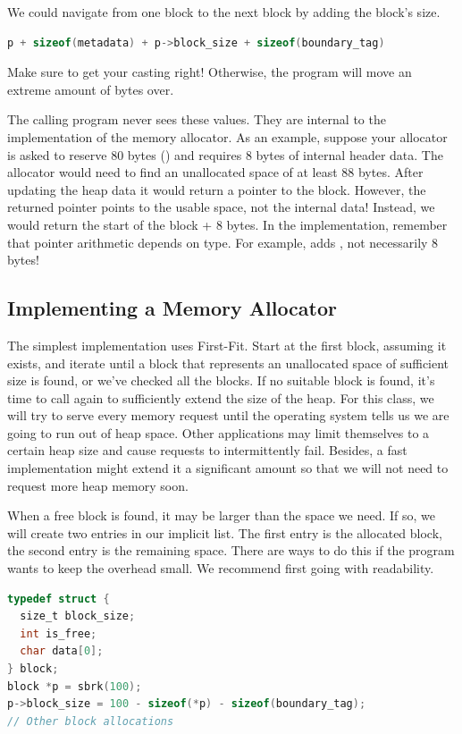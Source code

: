 We could navigate from one block to the next block by adding the block's size.

\begin{lstlisting}[language=C]
p + sizeof(metadata) + p->block_size + sizeof(boundary_tag)
\end{lstlisting}

Make sure to get your casting right!
Otherwise, the program will move an extreme amount of bytes over.

The calling program never sees these values.
They are internal to the implementation of the memory allocator.
As an example, suppose your allocator is asked to reserve 80 bytes () and requires 8 bytes of internal header data.
The allocator would need to find an unallocated space of at least 88 bytes.
After updating the heap data it would return a pointer to the block.
However, the returned pointer points to the usable space, not the internal data!
Instead, we would return the start of the block + 8 bytes.
In the implementation, remember that pointer arithmetic depends on type. For example,  adds , not necessarily 8 bytes!

\subsection{Implementing a Memory Allocator}

The simplest implementation uses First-Fit.
Start at the first block, assuming it exists, and iterate until a block that represents an unallocated space of sufficient size is found, or we've checked all the blocks.
If no suitable block is found, it's time to call  again to sufficiently extend the size of the heap.
For this class, we will try to serve every memory request until the operating system tells us we are going to run out of heap space.
Other applications may limit themselves to a certain heap size and cause requests to intermittently fail.
Besides, a fast implementation might extend it a significant amount so that we will not need to request more heap memory soon.

When a free block is found, it may be larger than the space we need.
If so, we will create two entries in our implicit list.
The first entry is the allocated block, the second entry is the remaining space.
There are ways to do this if the program wants to keep the overhead small.
We recommend first going with readability.

\begin{lstlisting}[language=C]
typedef struct {
  size_t block_size;
  int is_free;
  char data[0];
} block;
block *p = sbrk(100);
p->block_size = 100 - sizeof(*p) - sizeof(boundary_tag);
// Other block allocations
\end{lstlisting}

